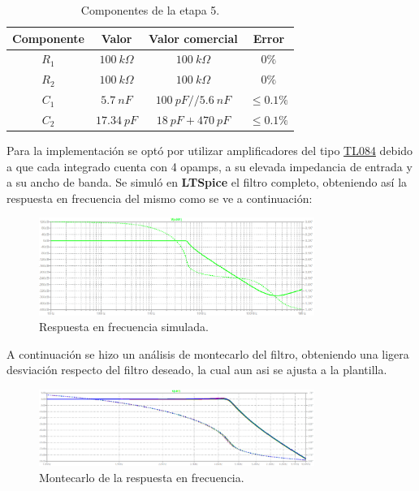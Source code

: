 \begin{table}[H]
\centering
\begin{tabular}{cccc}
\hline
Componente & Valor & Valor comercial & Error \\ \hline
$R_1$ & $100 \ k\Omega$ & $100 \ k\Omega$ & $0\%$ \\
$R_2$ & $100 \ k\Omega$ & $100 \ k\Omega$ & $0\%$\\
$C_1$ & $5.7 \ nF$ & $100 \ pF // 5.6 \ nF$ & $\le0.1\%$ \\
$C_2$ & $17.34 \ pF$ & $18 \ pF + 470 \ pF$ & $\le0.1\%$ \\ \hline
\end{tabular}
\caption{Componentes de la etapa 5.}
\end{table}

Para la implementación se optó por utilizar amplificadores del tipo \href{http://www.ti.com/lit/ds/symlink/tl082.pdf}{TL084} debido a que cada integrado cuenta con 4 opamps, a su elevada impedancia de entrada y a su ancho de banda. Se simuló en \textbf{LTSpice} el filtro completo, obteniendo así la respuesta en frecuencia del mismo como se ve a continuación:
 \begin{figure}[H]
	\centering
	\includegraphics[width=0.8\textwidth]{ImagenesEjercicio2/spice.PNG}
\caption{Respuesta en frecuencia simulada.}
	\label{fig:transspice}
\end{figure}
A continuación se hizo un análisis de montecarlo del filtro, obteniendo una ligera desviación respecto del filtro deseado, la cual aun asi se ajusta a la plantilla.
 \begin{figure}[H]
	\centering
	\includegraphics[width=0.8\textwidth]{ImagenesEjercicio2/montecarlo.PNG}
\caption{Montecarlo de la respuesta en frecuencia.}
	\label{fig:montecarlo}
\end{figure}
